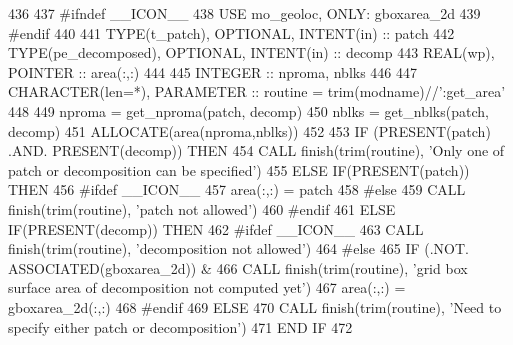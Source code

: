 \begin{DoxyCode}
436 
437 \textcolor{preprocessor}{#ifndef \_\_ICON\_\_}
438 \textcolor{preprocessor}{}    \textcolor{keywordtype}{USE }mo\_geoloc\textcolor{keywordtype}{, ONLY}: gboxarea\_2d
439 \textcolor{preprocessor}{#endif}
440 \textcolor{preprocessor}{}
441     \textcolor{keywordtype}{TYPE}(t\_patch),       \textcolor{keywordtype}{OPTIONAL}, \textcolor{keywordtype}{INTENT(in)}  :: patch
442     \textcolor{keywordtype}{TYPE}(pe\_decomposed), \textcolor{keywordtype}{OPTIONAL}, \textcolor{keywordtype}{INTENT(in)}  :: decomp
443     \textcolor{keywordtype}{REAL(wp)}, \textcolor{keywordtype}{POINTER}                          :: area(:,:)
444 
445     \textcolor{keywordtype}{INTEGER} :: nproma, nblks
446 
447     \textcolor{keywordtype}{CHARACTER(len=*)}, \textcolor{keywordtype}{PARAMETER} :: routine = trim(modname)//\textcolor{stringliteral}{':get\_area'}
448 
449     nproma = get\_nproma(patch, decomp)
450     nblks  = get\_nblks(patch, decomp)
451     \textcolor{keyword}{ALLOCATE}(area(nproma,nblks))
452 
453     \textcolor{keywordflow}{IF} (\textcolor{keyword}{PRESENT}(patch) .AND. \textcolor{keyword}{PRESENT}(decomp)) \textcolor{keywordflow}{THEN}
454       \textcolor{keyword}{CALL }finish(trim(routine), \textcolor{stringliteral}{'Only one of patch or decomposition can be specified'})
455     \textcolor{keywordflow}{ELSE} \textcolor{keywordflow}{IF}(\textcolor{keyword}{PRESENT}(patch)) \textcolor{keywordflow}{THEN}
456 \textcolor{preprocessor}{#ifdef \_\_ICON\_\_}
457 \textcolor{preprocessor}{}      area(:,:) = patch%
458 \textcolor{preprocessor}{#else}
459 \textcolor{preprocessor}{}      \textcolor{keyword}{CALL }finish(trim(routine), \textcolor{stringliteral}{'patch not allowed'})
460 \textcolor{preprocessor}{#endif}
461 \textcolor{preprocessor}{}    \textcolor{keywordflow}{ELSE} \textcolor{keywordflow}{IF}(\textcolor{keyword}{PRESENT}(decomp)) \textcolor{keywordflow}{THEN}
462 \textcolor{preprocessor}{#ifdef \_\_ICON\_\_}
463 \textcolor{preprocessor}{}      \textcolor{keyword}{CALL }finish(trim(routine), \textcolor{stringliteral}{'decomposition not allowed'})
464 \textcolor{preprocessor}{#else}
465 \textcolor{preprocessor}{}      \textcolor{keywordflow}{IF} (.NOT. \textcolor{keyword}{ASSOCIATED}(gboxarea\_2d)) &
466         \textcolor{keyword}{CALL }finish(trim(routine), \textcolor{stringliteral}{'grid box surface area of decomposition not computed yet'})
467       area(:,:) = gboxarea\_2d(:,:)
468 \textcolor{preprocessor}{#endif}
469 \textcolor{preprocessor}{}    \textcolor{keywordflow}{ELSE}
470       \textcolor{keyword}{CALL }finish(trim(routine), \textcolor{stringliteral}{'Need to specify either patch or decomposition'})
471 \textcolor{keywordflow}{    END IF}
472 
\end{DoxyCode}



